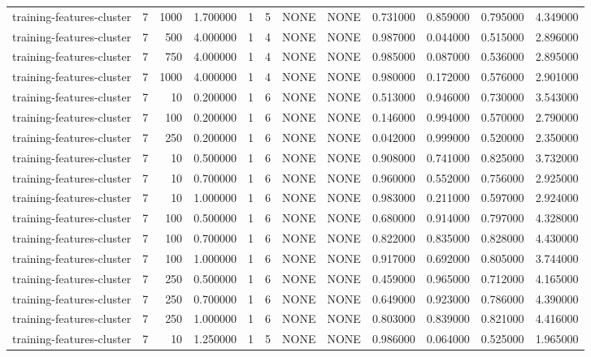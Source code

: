 \begin{tabular}{lrrrllllrrrr}
training-features-cluster & 7 & 1000 & 1.700000 & 1 & 5 & NONE & NONE & 0.731000 & 0.859000 & 0.795000 & 4.349000 \\
training-features-cluster & 7 & 500 & 4.000000 & 1 & 4 & NONE & NONE & 0.987000 & 0.044000 & 0.515000 & 2.896000 \\
training-features-cluster & 7 & 750 & 4.000000 & 1 & 4 & NONE & NONE & 0.985000 & 0.087000 & 0.536000 & 2.895000 \\
training-features-cluster & 7 & 1000 & 4.000000 & 1 & 4 & NONE & NONE & 0.980000 & 0.172000 & 0.576000 & 2.901000 \\
training-features-cluster & 7 & 10 & 0.200000 & 1 & 6 & NONE & NONE & 0.513000 & 0.946000 & 0.730000 & 3.543000 \\
training-features-cluster & 7 & 100 & 0.200000 & 1 & 6 & NONE & NONE & 0.146000 & 0.994000 & 0.570000 & 2.790000 \\
training-features-cluster & 7 & 250 & 0.200000 & 1 & 6 & NONE & NONE & 0.042000 & 0.999000 & 0.520000 & 2.350000 \\
training-features-cluster & 7 & 10 & 0.500000 & 1 & 6 & NONE & NONE & 0.908000 & 0.741000 & 0.825000 & 3.732000 \\
training-features-cluster & 7 & 10 & 0.700000 & 1 & 6 & NONE & NONE & 0.960000 & 0.552000 & 0.756000 & 2.925000 \\
training-features-cluster & 7 & 10 & 1.000000 & 1 & 6 & NONE & NONE & 0.983000 & 0.211000 & 0.597000 & 2.924000 \\
training-features-cluster & 7 & 100 & 0.500000 & 1 & 6 & NONE & NONE & 0.680000 & 0.914000 & 0.797000 & 4.328000 \\
training-features-cluster & 7 & 100 & 0.700000 & 1 & 6 & NONE & NONE & 0.822000 & 0.835000 & 0.828000 & 4.430000 \\
training-features-cluster & 7 & 100 & 1.000000 & 1 & 6 & NONE & NONE & 0.917000 & 0.692000 & 0.805000 & 3.744000 \\
training-features-cluster & 7 & 250 & 0.500000 & 1 & 6 & NONE & NONE & 0.459000 & 0.965000 & 0.712000 & 4.165000 \\
training-features-cluster & 7 & 250 & 0.700000 & 1 & 6 & NONE & NONE & 0.649000 & 0.923000 & 0.786000 & 4.390000 \\
training-features-cluster & 7 & 250 & 1.000000 & 1 & 6 & NONE & NONE & 0.803000 & 0.839000 & 0.821000 & 4.416000 \\
training-features-cluster & 7 & 10 & 1.250000 & 1 & 5 & NONE & NONE & 0.986000 & 0.064000 & 0.525000 & 1.965000 \\

\end{tabular}
